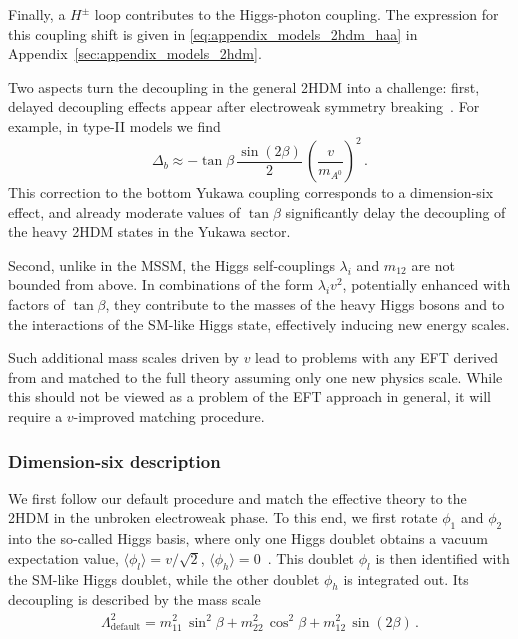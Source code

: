 Finally, a $H^\pm$ loop contributes to the Higgs-photon coupling. The
expression for this coupling shift is given in
\autoref{eq:appendix_models_2hdm_haa} in
Appendix~\ref{sec:appendix_models_2hdm}.

\newparagraph
%
Two aspects turn the decoupling in the general 2HDM into a challenge:
first, delayed decoupling effects appear after electroweak symmetry
breaking~\cite{Haber:2000kq}. For example, in type-II models we
find~\cite{Lopez-Val:2013yba}
%
\begin{equation}
  \Delta_b
  \approx - \tan \beta \, \frac{\sin (2\beta)} 2 \, \left( \frac{v}{m_{A^0}} \right)^2 \,.
  \label{eq:validity_2hdm_delayed}
\end{equation}
%
This correction to the bottom Yukawa coupling corresponds to a
dimension-six effect, and already moderate values of $\tan \beta$
significantly delay the decoupling of the heavy 2HDM states in the
Yukawa sector.

Second, unlike in the MSSM, the Higgs self-couplings $\lambda_i$ and
$m_{12}$ are not bounded from above. In combinations of the form
$\lambda_i v^2$, potentially enhanced with factors of $\tan \beta$,
they contribute to the masses of the heavy Higgs bosons and to the
interactions of the SM-like Higgs state, effectively inducing new
energy scales.

Such additional mass scales driven by $v$ lead to problems with any
EFT derived from and matched to the full theory assuming only one new
physics scale. While this should not be viewed as a problem of the EFT
approach in general, it will require a $v$-improved matching
procedure.



\subsubsection{Dimension-six description}

We first follow our default procedure and match the effective theory
to the 2HDM in the unbroken electroweak phase. To this end, we first
rotate $\phi_1$ and $\phi_2$ into the so-called Higgs basis, where
only one Higgs doublet obtains a vacuum expectation value,
$\langle \phi_l \rangle = v/\sqrt{2}$,
$\langle \phi_h \rangle = 0$~\cite{Glashow:1976nt, Davidson:2005cw}.
This doublet $\phi_l$ is then identified with the SM-like Higgs
doublet, while the other doublet $\phi_h$ is integrated out. Its
decoupling is described by the mass scale
%
\begin{align}
  \Lambda_{\text{default}}^2 = m^2_{11} \, \sin^2 \! \beta + m^2_{22} \, \cos^2 \! \beta + m^2_{12} \, \sin (2\beta) \,.
\end{align}


